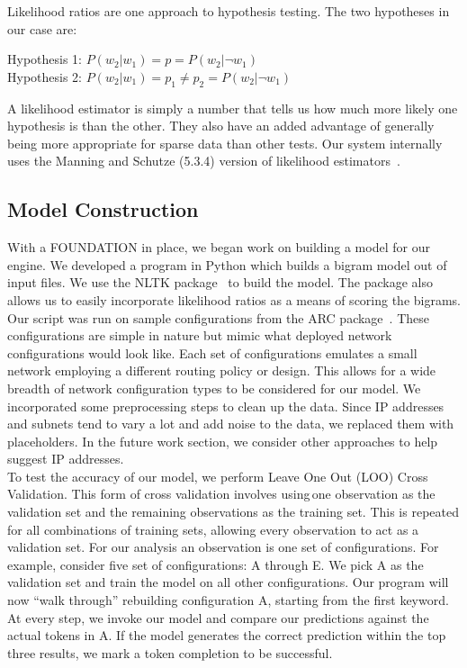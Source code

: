 Likelihood ratios are one approach to hypothesis testing. The two hypotheses in our case are:

\begin{center}
Hypothesis 1: $P(w_2|w_1) = p = P(w_2|\neg w_1)$ \\
Hypothesis 2: $P(w_2|w_1) = p_1 \neq p_2 = P(w_2|\neg w_1)$	\\	
\end{center}

A likelihood estimator is simply a number that tells us how much more likely one hypothesis is than the other. They also have an added advantage of generally being more appropriate for sparse data than other tests. Our system internally uses the Manning and Schutze (5.3.4) version of likelihood estimators~\cite{manning}.


\subsection{Model Construction}

With a FOUNDATION in place, we began work on building a model for our engine. We developed a program in Python which builds a bigram model out of input files. We use the NLTK package~\cite{nltk} to build the model. The package also allows us to easily incorporate likelihood ratios as a means of scoring the bigrams. Our script was run on sample configurations from the ARC package~\cite{arc}. These configurations are simple in nature but mimic what deployed network configurations would look like. Each set of configurations emulates a small network employing a different routing policy or design. This allows for a wide breadth of network configuration types to be considered for our model. We incorporated some preprocessing steps to clean up the data. Since IP addresses and subnets tend to vary a lot and add noise to the data, we replaced them with placeholders. In the future work section, we consider other approaches to help suggest IP addresses.\\

To test the accuracy of our model, we perform Leave One Out (LOO) Cross Validation. This form of cross validation involves using one observation as the validation set and the remaining observations as the training set. This is repeated for all combinations of training sets, allowing every observation to act as a validation set. For our analysis an observation is one set of configurations. For example, consider five set of configurations: A through E. We pick A as the validation set and train the model on all other configurations. Our program will now “walk through” rebuilding configuration A, starting from the first keyword. At every step, we invoke our model and compare our predictions against the actual tokens in A. If the model generates the correct prediction within the top three results, we mark a token completion to be successful.\\
 

